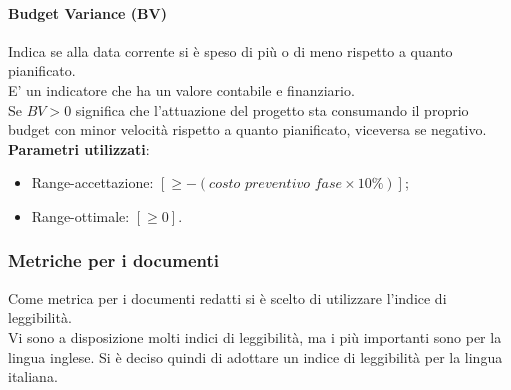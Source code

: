\paragraph{Budget Variance (BV)}
Indica se alla data corrente si è speso di più o di meno rispetto a quanto pianificato.\\
E' un indicatore che ha un valore contabile e finanziario.\\
Se $BV > 0$ significa che l'attuazione del progetto sta consumando il proprio budget con minor velocità rispetto a quanto pianificato, viceversa se negativo.\\
\textbf{Parametri utilizzati}:
\begin{itemize}
\item Range-accettazione: $[\geq-(\textit{costo preventivo fase}\times10\%)]$;
\item Range-ottimale: $[\geq0]$.
\end{itemize}

\subsubsection{Metriche per i documenti}
Come metrica per i documenti redatti si è scelto di utilizzare l'indice di leggibilità.\\
Vi sono a disposizione molti indici di leggibilità, ma i più importanti sono per la lingua inglese. Si è deciso quindi di adottare un indice di leggibilità per la lingua italiana.

